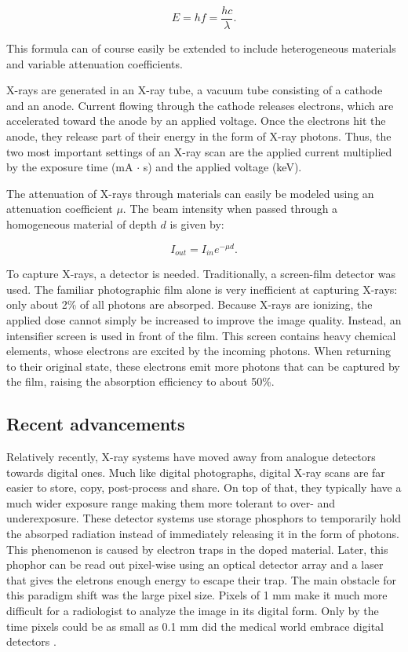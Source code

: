 \begin{equation}
	E = hf = \frac{hc}{\lambda}.
\end{equation}

This formula can of course easily be extended to include heterogeneous materials
and variable attenuation coefficients.

X-rays are generated in an X-ray tube, a vacuum tube consisting of a cathode and
an anode. Current flowing through the cathode releases electrons,
which are accelerated toward the anode by an applied voltage. Once the electrons
hit the anode, they release part of their energy in the form of X-ray photons.
Thus, the two most important settings of an X-ray scan are the applied
current multiplied by the exposure time (mA $\cdot$ s) and the applied voltage
(keV).

The attenuation of X-rays through materials can easily be modeled using an
attenuation coefficient $\mu$. The beam intensity when passed through a
homogeneous material of depth $d$ is given by: 

\begin{equation}
	I_{out} = I_{in} e^{-\mu d}.
\end{equation}

To capture X-rays, a detector is needed. Traditionally, a screen-film detector
was used. The familiar photographic film alone is very inefficient
at capturing X-rays: only about 2\% of all photons are absorped. Because X-rays
are ionizing, the applied dose cannot simply be increased to improve the
image quality. Instead, an intensifier screen is used in front of the film. This
screen contains heavy chemical elements, whose electrons are excited by the
incoming photons. When returning to their original state, these electrons emit
more photons that can be captured by the film, raising the absorption efficiency
to about 50\%.


\subsection{Recent advancements}
Relatively recently, X-ray systems have moved away from analogue detectors
towards digital ones. Much like digital photographs, digital X-ray scans are far
easier to store, copy, post-process and share. On top of that, they typically
have a much wider exposure range making them more tolerant to over- and
underexposure. These detector systems use storage phosphors to temporarily hold
the absorped radiation instead of immediately releasing it in the form of
photons. This phenomenon is caused by electron traps in the doped material.
Later, this phophor can be read out pixel-wise using an optical detector array
and a laser that gives the eletrons enough energy to escape their trap. The main
obstacle for this paradigm shift was the large pixel size. Pixels of 1 mm make
it much more difficult for a radiologist to analyze the image in its digital
form. Only by the time pixels could be as small as 0.1 mm did the medical world
embrace digital detectors \cite{review}.

